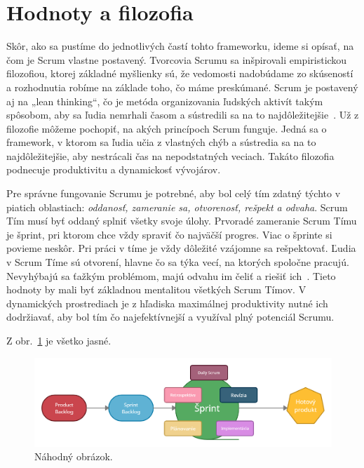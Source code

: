 \documentclass[10pt,slovak,a4paper]{article}
\begin{document}
\section{Hodnoty a filozofia} \label{hodnoty}
Skôr, ako sa pustíme do jednotlivých častí tohto frameworku, ideme si opísať, na čom je Scrum vlastne postavený. Tvorcovia Scrumu sa inšpirovali empiristickou filozofiou, ktorej základné myšlienky sú, že vedomosti nadobúdame zo skúseností a rozhodnutia robíme na základe toho, čo máme preskúmané. Scrum je postavený aj na „lean thinking“, čo je metóda organizovania ľudských aktivít takým spôsobom, aby sa ľudia nemrhali časom a sústredili sa na to najdôležitejšie~\cite{schwaber2020scrum}. Už z filozofie môžeme pochopiť, na akých princípoch Scrum funguje. Jedná sa o framework, v ktorom sa ľudia učia z vlastných chýb a sústredia sa na to najdôležitejšie, aby nestrácali čas na nepodstatných veciach. Takáto filozofia podnecuje produktivitu a dynamickosť vývojárov.

Pre správne fungovanie Scrumu je potrebné, aby bol celý tím zdatný týchto v piatich oblastiach: \emph{oddanosť, zameranie sa, otvorenosť, rešpekt a odvaha}. Scrum Tím musí byť oddaný splniť všetky svoje úlohy. Prvoradé zameranie Scrum Tímu je šprint, pri ktorom chce vždy spraviť čo najväčší progres. Viac o šprinte si povieme neskôr. Pri práci v tíme je vždy dôležité vzájomne sa rešpektovať. Ľudia v Scrum Tíme sú otvorení, hlavne čo sa týka vecí, na ktorých spoločne pracujú. Nevyhýbajú sa ťažkým problémom, majú odvahu im čeliť a riešiť ich~\cite{schwaber2020scrum}. Tieto hodnoty by mali byť základnou mentalitou všetkých Scrum Tímov. V dynamických prostrediach je z hľadiska maximálnej produktivity nutné ich dodržiavať, aby bol tím čo najefektívnejší a využíval plný potenciál Scrumu. 


Z obr.~\ref{f:rozhod} je všetko jasné. 

\begin{figure}[tbh]
\centering
\includegraphics[width=1.0\textwidth]{diagram}
\caption{Náhodný obrázok.}
\label{f:rozhod}
\end{figure}
\end{document}
